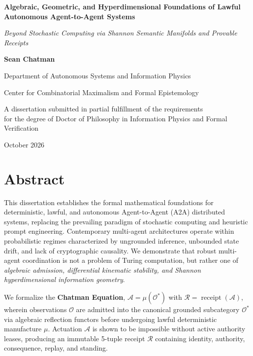 \documentclass[12pt,oneside,a4paper]{book}
\theoremstyle{definition}
\theoremstyle{plain}
\theoremstyle{remark}
\DeclareMathOperator{\receipt}{receipt}
\begin{document}
\frontmatter

\begin{titlepage}
    \centering
    \vspace*{1.5cm}
    
    {\Huge \bfseries Algebraic, Geometric, and Hyperdimensional Foundations of Lawful Autonomous Agent-to-Agent Systems\par}
    \vspace{0.8cm}
    {\LARGE \itshape Beyond Stochastic Computing via Shannon Semantic Manifolds and Provable Receipts\par}
    
    \vspace{2cm}
    {\Large \textbf{Sean Chatman}\par}
    \vspace{0.5cm}
    {\large Department of Autonomous Systems and Information Physics\par}
    \vspace{0.2cm}
    {\large Center for Combinatorial Maximalism and Formal Epistemology\par}
    
    \vfill
    {\large A dissertation submitted in partial fulfillment of the requirements\\
    for the degree of Doctor of Philosophy in Information Physics and Formal Verification\par}
    
    \vspace{1.5cm}
    {\large October 2026\par}
\end{titlepage}

\chapter*{Abstract}
This dissertation establishes the formal mathematical foundations for deterministic, lawful, and autonomous Agent-to-Agent (A2A) distributed systems, replacing the prevailing paradigm of stochastic computing and heuristic prompt engineering. Contemporary multi-agent architectures operate within probabilistic regimes characterized by ungrounded inference, unbounded state drift, and lack of cryptographic causality. We demonstrate that robust multi-agent coordination is not a problem of Turing computation, but rather one of \emph{algebraic admission, differential kinematic stability, and Shannon hyperdimensional information geometry}.

We formalize the \textbf{Chatman Equation}, $\mathcal{A} = \mu(\mathcal{O}^*)$ with $\mathcal{R} = \receipt(\mathcal{A})$, wherein observations $\mathcal{O}$ are admitted into the canonical grounded subcategory $\mathcal{O}^*$ via algebraic reflection functors before undergoing lawful deterministic manufacture $\mu$. Actuation $\mathcal{A}$ is shown to be impossible without active authority leases, producing an immutable 5-tuple receipt $\mathcal{R}$ containing identity, authority, consequence, replay, and standing. 
\end{document}
